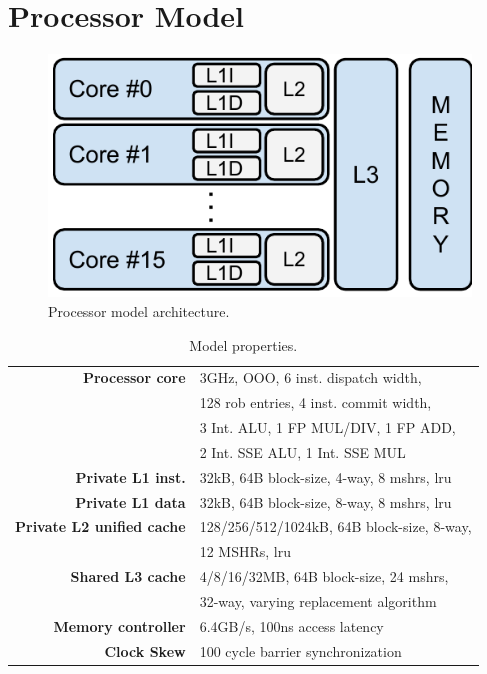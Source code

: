 \section{Processor Model}
\label{sec:methodology:processor_model}

\begin{figure}[ht]
\centering
\includegraphics[scale=.65]{figures/processor_model/processor_model}
\caption{Processor model architecture.}
\label{fig:processor_model}
\end{figure}

\begin{table}[ht]
\centering
\begin{tabular}{rl}
\toprule
\bf{Processor core}                 & 3GHz, OOO, 6 inst. dispatch width,     \\
                                    & 128 rob entries, 4 inst. commit width, \\
                                    & 3 Int. ALU, 1 FP MUL/DIV, 1 FP ADD, \\
                                    & 2 Int. SSE ALU, 1 Int. SSE MUL \\
\bf{Private L1 inst.}               & 32kB, 64B block-size, 4-way, 8 mshrs, \gls{lru} \\
\bf{Private L1 data}                & 32kB, 64B block-size, 8-way, 8 mshrs, \gls{lru} \\
\bf{Private L2 unified cache}       & 128/256/512/1024kB, 64B block-size, 8-way, \\
                                    & 12 MSHRs, \gls{lru}      \\
\bf{Shared L3 cache}                & 4/8/16/32MB, 64B block-size, 24 mshrs, \\
                                    & 32-way, varying replacement algorithm         \\
\bf{Memory controller}              & 6.4GB/s, 100ns access latency         \\
\bf{Clock Skew}                     & 100 cycle barrier synchronization        \\
\bottomrule                             
\end{tabular}
\caption{Model properties.}
\label{tbl:processor_model:properties}
\end{table}

